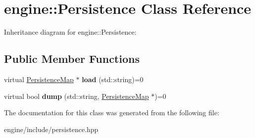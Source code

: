 \hypertarget{classengine_1_1_persistence}{}\section{engine\+:\+:Persistence Class Reference}
\label{classengine_1_1_persistence}


Inheritance diagram for engine\+:\+:Persistence\+:
\subsection*{Public Member Functions}
\begin{DoxyCompactItemize}
\item 
virtual \hyperlink{classengine_1_1_persistence_map}{Persistence\+Map} $\ast$ {\bfseries load} (std\+::string)=0\hypertarget{classengine_1_1_persistence_abddb0f97de758c734efae77fdd48aa3f}{}\label{classengine_1_1_persistence_abddb0f97de758c734efae77fdd48aa3f}

\item 
virtual bool {\bfseries dump} (std\+::string, \hyperlink{classengine_1_1_persistence_map}{Persistence\+Map} $\ast$)=0\hypertarget{classengine_1_1_persistence_ab751bf0509f9478666b0cc2158994a53}{}\label{classengine_1_1_persistence_ab751bf0509f9478666b0cc2158994a53}

\end{DoxyCompactItemize}


The documentation for this class was generated from the following file\+:\begin{DoxyCompactItemize}
\item 
engine/include/persistence.\+hpp\end{DoxyCompactItemize}
